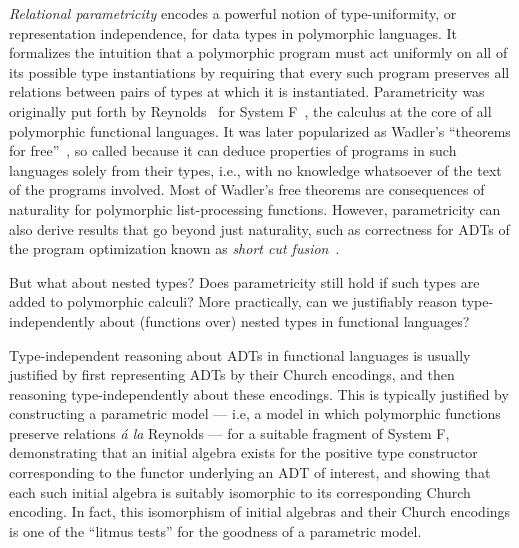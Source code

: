 \documentclass[runningheads]{llncs}
\begin{document}
{\em Relational parametricity} encodes a powerful notion of
type-uniformity, or representation independence, for data types in
polymorphic languages. It formalizes the intuition that a polymorphic
program must act uniformly on all of its possible type instantiations
by requiring that every such program preserves all relations between
pairs of types at which it is instantiated. Parametricity was
originally put forth by Reynolds~\cite{rey83} for System
F~\cite{gir72}, the calculus at the core of all polymorphic functional
languages. It was later popularized as Wadler's ``theorems for
free''~\cite{wad89}, so called because it can deduce properties of
programs in such languages solely from their types, i.e., with no
knowledge whatsoever of the text of the programs involved.  Most of
Wadler's free theorems are consequences of naturality for polymorphic
list-processing functions. However, parametricity can also derive
results that go beyond just naturality, such as correctness for ADTs
of the program optimization known as {\em short cut
  fusion}~\cite{glp93,joh02}.

But what about nested types? Does parametricity still hold if such
types are added to polymorphic calculi? More practically, can we
justifiably reason type-independently about (functions over) nested
types in functional languages?

Type-independent reasoning about ADTs in functional languages is
usually justified by first representing ADTs by their Church
encodings, and then reasoning type-independently about these
encodings. This is typically justified by constructing a parametric
model --- i.e, a model in which polymorphic functions preserve
relations {\em \'a la} Reynolds --- for a suitable fragment of System
F, demonstrating that an initial algebra exists for the positive type
constructor corresponding to the functor underlying an ADT of
interest, and showing that each such initial algebra is suitably
isomorphic to its corresponding Church encoding. In fact, this
isomorphism of initial algebras and their Church encodings is one of
the ``litmus tests'' for the goodness of a parametric model.
\end{document}
